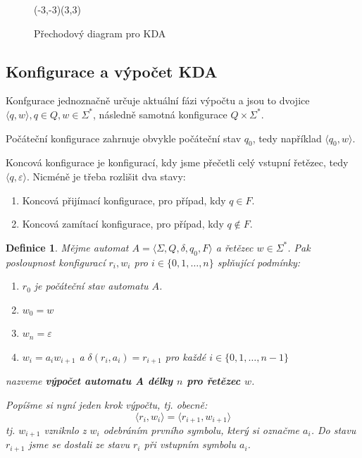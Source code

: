 \documentclass[10pt, a4paper, titlepage]{article}
\theoremstyle{note}
\newtheorem{definice}{Definice}
\begin{document}
\begin{figure}[ht]
\begin{center}
\begin{VCPicture}{(-3,-3)(3,3)}


\end{VCPicture}
\end{center}
\caption{Přechodový diagram pro KDA}
\end{figure}

\subsection{Konfigurace a výpočet KDA}

Konfgurace jednoznačně určuje aktuální fázi výpočtu a jsou to dvojice $\langle q, w \rangle, q \in Q, w \in \Sigma^*$, následně
samotná konfigurace $Q \times \Sigma^*$.

Počáteční konfigurace zahrnuje obvykle počáteční stav $q_0$, tedy například $\langle q_0, w \rangle$.

Koncová konfigurace je konfigurací, kdy jsme přečetli celý vstupní řetězec,
tedy $\langle q, \varepsilon \rangle$. Nicméně je třeba rozlišit dva stavy:
\begin{enumerate}
\item
Koncová přijímací konfigurace, pro případ, kdy $q \in F$.

\item
Koncová zamítací konfigurace, pro případ, kdy $q \notin F$.
\end{enumerate}

\begin{definice}
Mějme automat $A = \langle \Sigma, Q, \delta, q_0, F \rangle$ a řetězec $w \in \Sigma^*$. Pak posloupnost
konfigurací $r_i, w_i$ pro $i \in \lbrace 0, 1, \ldots, n \rbrace$ splňující podmínky:
\begin{enumerate}
\item
$r_0$ je počáteční stav automatu $A$.

\item
$w_0 = w$

\item
$w_n = \varepsilon$

\item \label{vypocet-bod-4}
$w_i = a_i w_{i+1}$ a $\delta(r_i, a_i) = r_{i+1}$ pro každé $i \in \lbrace 0,1,\ldots,n-1 \rbrace$
\end{enumerate}
nazveme \textbf{výpočet automatu A délky $n$ pro řetězec $w$}.

Popíšme si nyní jeden krok výpočtu, tj. obecně:
$$
\langle r_i, w_i \rangle = \langle r_{i+1}, w_{i+1} \rangle
$$
tj. $w_{i+1}$ vzniknlo z $w_i$ odebráním prvního symbolu, který si označme $a_i$. Do stavu $r_{i+1}$ jsme se dostali ze
stavu $r_i$ při vstupním symbolu $a_i$.
\end{definice}
\end{document}

